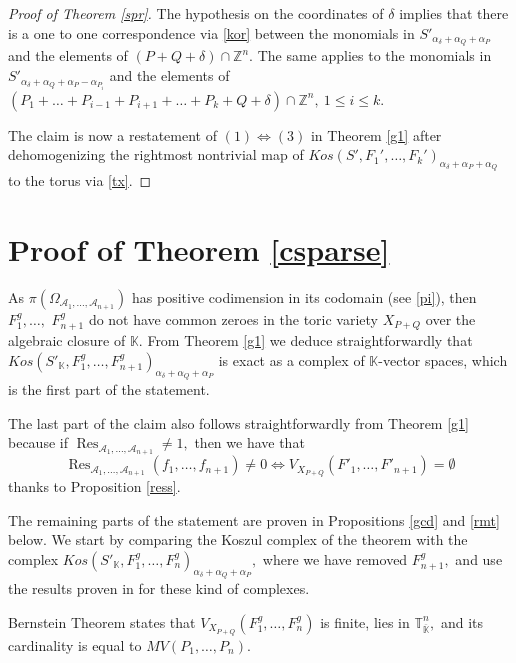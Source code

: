 \documentclass[a4paper,11pt]{amsart}
\newcommand{\Res}{\operatorname{Res}}
\newcommand{\K}{\mathbb{K}}
\newcommand{\T}{\mathbb{T}}
\newcommand{\Z}{\mathbb{Z}}
\newcommand{\cA}{{\mathcal A}}
\numberwithin{thm}{section}
\numberwithin{equation}{section}
\theoremstyle{definition}
\theoremstyle{plain}
\begin{document}
\smallskip
\begin{proof}[Proof of Theorem \ref{spr}]
The hypothesis on the coordinates of $\delta$ implies that there is a one to one correspondence via \eqref{kor} between the monomials in  $S'_{\alpha_\delta+\alpha_Q+\alpha_P}$  and the elements of
 $(P+Q+\delta)\cap\Z^n$. The same applies to the monomials in $S'_{\alpha_\delta+\alpha_Q+\alpha_P-\alpha_{P_i}}$  and the elements of  $(P_1+\ldots +P_{i-1}+P_{i+1}+\ldots+P_k+Q+\delta)\cap\Z^n, \ 1\leq i\leq k.$

The claim is now a restatement of $(1)\iff (3)$ in Theorem \ref{g1} after dehomogenizing the rightmost nontrivial map of $Kos(S',F_1',\ldots, F_k')_{\alpha_\delta+\alpha_P+\alpha_Q}$ to the torus via \eqref{tx}.
\end{proof}
\bigskip
\section{Proof of Theorem \ref{csparse}}\label{ultt}
As $\pi(\Omega_{\cA_1,\ldots, \cA_{n+1}})$ has positive codimension in its codomain (see \eqref{pi}),  then
$F^g_1,\ldots,$ $F^g_{ n+1}$ do not have common zeroes in the toric variety $X_{P+Q}$ over the algebraic closure of $\K.$
From Theorem \ref{g1} we deduce straightforwardly that $Kos(S'_\K,F^g_1,\ldots, F^g_{n+1})_{\alpha_\delta+\alpha_Q+\alpha_P}$ is exact as a complex of $\K$-vector spaces, which is the first part of the statement.


The last part of the claim also follows straightforwardly from Theorem \ref{g1} because if $\Res_{\cA_1,\ldots, \cA_{n+1}}\neq1,$ then we have that $$\Res_{\cA_1,\ldots, \cA_{n+1}}(f_1,\ldots, f_{n+1})\neq0 \iff V_{X_{P+Q}}(F'_1,\ldots, F'_{n+1})=\emptyset$$ thanks to Proposition \ref{ress}.


The remaining parts of the statement are proven in Propositions \ref{gcd} and \ref{rmt} below. We start by comparing the Koszul complex of the theorem with the complex $Kos(S'_\K,F^g_1,\ldots, F^g_{n})_{\alpha_\delta+\alpha_Q+\alpha_P},$ where we have removed $F^g_{n+1},$ and use the results proven in \cite{BT22} for these kind of complexes.

Bernstein Theorem \cite{ber75} states that  $V_{X_{P+Q}}(F^g_1,\ldots, F^g_n)$ is finite, lies in $\T_{\overline{\mathbb{K}}}^n,$  and its cardinality is equal to  $MV(P_1,\ldots, P_n).$
\end{document}
